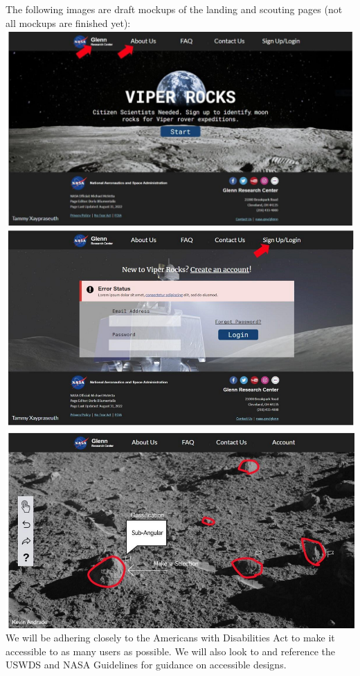 \documentclass{article}
\begin{document}
The following images are draft mockups of the landing and scouting pages (not all mockups are finished yet): \\
\includegraphics{landing_page_1}
\includegraphics{landing_page_4}
\includegraphics{scouting_page}
We will be adhering closely to the Americans with Disabilities Act to make it accessible to as many users as possible. We will also look to and reference the USWDS and NASA Guidelines for guidance on accessible designs.
\end{document}
